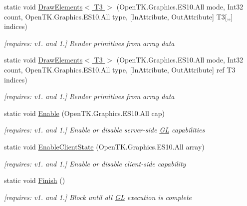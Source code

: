 \begin{DoxyCompactItemize}
static void \hyperlink{class_open_t_k_1_1_graphics_1_1_e_s10_1_1_g_l_a72f11b5ed2fe52e4fba3a92988286c5b}{Draw\-Elements$<$ T3 $>$} (Open\-T\-K.\-Graphics.\-E\-S10.\-All mode, Int32 count, Open\-T\-K.\-Graphics.\-E\-S10.\-All type, \mbox{[}In\-Attribute, Out\-Attribute\mbox{]} T3\mbox{[},,\mbox{]} indices)
\begin{DoxyCompactList}\small\item\em \mbox{[}requires\-: v1. and 1.\mbox{]} Render primitives from array data \end{DoxyCompactList}\item 
static void \hyperlink{class_open_t_k_1_1_graphics_1_1_e_s10_1_1_g_l_a26c91f36f3a4b816b059e26b80584d48}{Draw\-Elements$<$ T3 $>$} (Open\-T\-K.\-Graphics.\-E\-S10.\-All mode, Int32 count, Open\-T\-K.\-Graphics.\-E\-S10.\-All type, \mbox{[}In\-Attribute, Out\-Attribute\mbox{]} ref T3 indices)
\begin{DoxyCompactList}\small\item\em \mbox{[}requires\-: v1. and 1.\mbox{]} Render primitives from array data \end{DoxyCompactList}\item 
static void \hyperlink{class_open_t_k_1_1_graphics_1_1_e_s10_1_1_g_l_a1d90f0cf2c034a8195abdc1eeecc48bb}{Enable} (Open\-T\-K.\-Graphics.\-E\-S10.\-All cap)
\begin{DoxyCompactList}\small\item\em \mbox{[}requires\-: v1. and 1.\mbox{]} Enable or disable server-\/side \hyperlink{class_open_t_k_1_1_graphics_1_1_e_s10_1_1_g_l}{G\-L} capabilities \end{DoxyCompactList}\item 
static void \hyperlink{class_open_t_k_1_1_graphics_1_1_e_s10_1_1_g_l_ab9f4e2b75f016bdcd7eba21eecec2dd3}{Enable\-Client\-State} (Open\-T\-K.\-Graphics.\-E\-S10.\-All array)
\begin{DoxyCompactList}\small\item\em \mbox{[}requires\-: v1. and 1.\mbox{]} Enable or disable client-\/side capability \end{DoxyCompactList}\item 
static void \hyperlink{class_open_t_k_1_1_graphics_1_1_e_s10_1_1_g_l_a2bbb42830e56e881c2d64e60ded44fc8}{Finish} ()
\begin{DoxyCompactList}\small\item\em \mbox{[}requires\-: v1. and 1.\mbox{]} Block until all \hyperlink{class_open_t_k_1_1_graphics_1_1_e_s10_1_1_g_l}{G\-L} execution is complete \end{DoxyCompactList}\item 

\end{DoxyCompactItemize}
